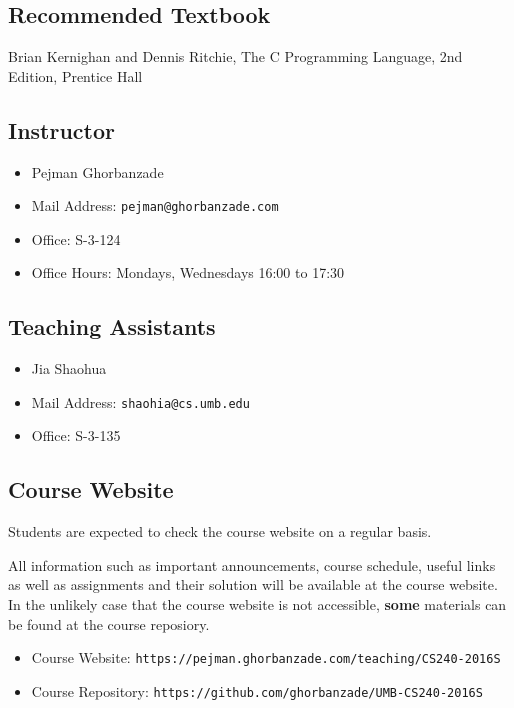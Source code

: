 \documentclass[12pt,letterpaper,twoside]{article}
\begin{document}
\subsection*{Recommended Textbook}
Brian Kernighan and Dennis Ritchie, The C Programming Language, 2nd Edition, Prentice Hall

\subsection*{Instructor}
\begin{itemize}
\item[] Pejman Ghorbanzade
\item[] Mail Address: \texttt{pejman@ghorbanzade.com}
\item[] Office: S-3-124
\item[] Office Hours: Mondays, Wednesdays 16:00 to 17:30
\end{itemize}

\subsection*{Teaching Assistants}
\begin{itemize}
\item[] Jia Shaohua
\item[] Mail Address: \texttt{shaohia@cs.umb.edu}
\item[] Office: S-3-135
\end{itemize}

\subsection*{Course Website}
Students are expected to check the course website on a regular basis.

All information such as important announcements, course schedule, useful links as well as assignments and their solution will be available at the course website.
In the unlikely case that the course website is not accessible, \textbf{some} materials can be found at the course reposiory.

\begin{itemize}
\item[] Course Website: \texttt{\footnotesize https://pejman.ghorbanzade.com/teaching/CS240-2016S}
\item[] Course Repository: \texttt{\footnotesize https://github.com/ghorbanzade/UMB-CS240-2016S}
\end{itemize}
\end{document}

